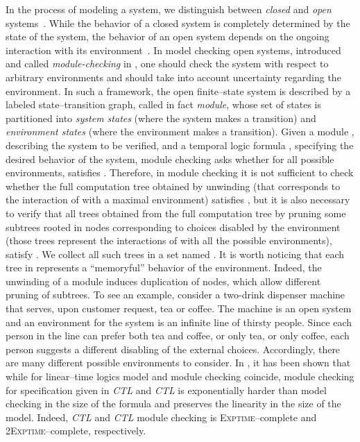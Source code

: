 \documentclass{LMCS}
\theoremstyle{plain}
\def \CTL           {\emph{CTL}\xspace}
\def \CTLSTAR       {\emph{CTL}\xspace}
\def \EXPTIME       {\textsc{Exptime}\xspace}
\def \TWOEXPTIME    {\textsc{2Exptime}\xspace}
\begin{document}
In the process of modeling a system, we distinguish between \emph{closed} and
\emph{open} systems~\cite{HP85}. While the behavior of a closed system is
completely determined by the state of the system, the behavior of an open
system depends on the ongoing interaction with its environment~\cite{Hoa85}. In
model checking open systems, introduced and called \emph{module-checking} in
\cite{KVW01}, one should check the system with respect to arbitrary
environments and should take into account uncertainty regarding the
environment. In such a framework, the open finite--state system is described by
a labeled state--transition graph, called in fact \emph{module}, whose set of
states is partitioned into \emph{system states} (where the system makes a
transition) and \emph{environment states} (where the environment makes a
transition). Given a module , describing the system to be verified, and a
temporal logic formula , specifying the desired behavior of the
system, module checking asks whether for all possible environments, 
satisfies . Therefore, in module checking it is not sufficient to
check whether the full computation tree obtained by unwinding  (that
corresponds to the interaction of  with a maximal environment) satisfies
, but it is also necessary to verify that all trees obtained from the
full computation tree by pruning some subtrees rooted in nodes corresponding to
choices disabled by the environment (those trees represent the interactions of
 with all the possible environments), satisfy . We collect all
such trees in a set named . It is worth noticing that each tree in
 represents a ``memoryful'' behavior of the environment. Indeed, the
unwinding of a module  induces duplication of nodes, which allow different
pruning of subtrees. To see an example, consider a two-drink dispenser machine
that serves, upon customer request, tea or coffee. The machine is an open
system and an environment for the system is an infinite line of thirsty people.
Since each person in the line can prefer both tea and coffee, or only tea, or
only coffee, each person suggests a different disabling of the external
choices. Accordingly, there are many different possible environments to
consider. In \cite{KV97,KVW01}, it has been shown that while for linear--time
logics model and module checking coincide, module checking for specification
given in \CTL and \CTLSTAR is exponentially harder than model checking in the
size of the formula and preserves the linearity in the size of the model.
Indeed, \CTL and \CTLSTAR module checking is \EXPTIME--complete and
\TWOEXPTIME--complete, respectively.
\end{document}
